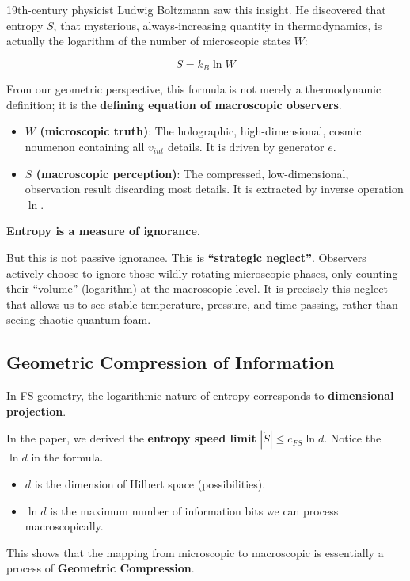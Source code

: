 19th-century physicist Ludwig Boltzmann saw this insight. He discovered that entropy $S$, that mysterious, always-increasing quantity in thermodynamics, is actually the logarithm of the number of microscopic states $W$:

$$S = k_B \ln W$$

From our geometric perspective, this formula is not merely a thermodynamic definition; it is the \textbf{defining equation of macroscopic observers}.

\begin{itemize}
\item \textbf{$W$ (microscopic truth)}: The holographic, high-dimensional, cosmic noumenon containing all $v_{int}$ details. It is driven by generator $e$.

\item \textbf{$S$ (macroscopic perception)}: The compressed, low-dimensional, observation result discarding most details. It is extracted by inverse operation $\ln$.
\end{itemize}

\textbf{Entropy is a measure of ignorance.}

But this is not passive ignorance. This is \textbf{``strategic neglect''}. Observers actively choose to ignore those wildly rotating microscopic phases, only counting their ``volume'' (logarithm) at the macroscopic level. It is precisely this neglect that allows us to see stable temperature, pressure, and time passing, rather than seeing chaotic quantum foam.

\subsection{Geometric Compression of Information}

In FS geometry, the logarithmic nature of entropy corresponds to \textbf{dimensional projection}.

In the paper, we derived the \textbf{entropy speed limit} $|\dot{S}| \le c_{FS} \ln d$. Notice the \textbf{$\ln d$} in the formula.

\begin{itemize}
\item $d$ is the dimension of Hilbert space (possibilities).

\item $\ln d$ is the maximum number of information bits we can process macroscopically.
\end{itemize}

This shows that the mapping from microscopic to macroscopic is essentially a process of \textbf{Geometric Compression}.

